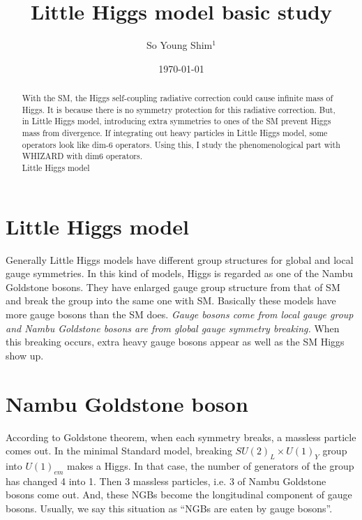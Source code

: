 \documentclass[aps,preprint,floatfix,nofootinbib,showpacs]{revtex4-1}
\begin{document}
\title{Little Higgs model basic study}
\bigskip
\author{So Young Shim$^{1}$}
\date{\today}

\begin{abstract}
With the SM, the Higgs self-coupling radiative correction could cause infinite mass of Higgs. 
It is because there is no symmetry protection for this radiative correction.
But, in Little Higgs model, introducing extra symmetries 
to ones of the SM prevent Higgs mass from divergence.
If integrating out heavy particles in Little Higgs model, 
some operators look like dim-6 operators.
Using this, I study the phenomenological part with WHIZARD with dim6 operators.\\
Little Higgs model 
\end{abstract}

\maketitle


\section{Little Higgs model}
\label{sec:introduction}
Generally Little Higgs models have different group structures 
for global and local gauge symmetries.
In this kind of models, Higgs is regarded as one of the Nambu Goldstone bosons.
They have enlarged gauge group structure from that of SM and 
break the group into the same one with SM. 
Basically these models have more gauge bosons than the SM does. 
{\it Gauge bosons come from local gauge group and Nambu Goldstone 
bosons are from global gauge symmetry breaking.}
When this breaking occurs, extra heavy gauge bosons appear as well as the SM Higgs show up. 

\section{Nambu Goldstone boson}
According to Goldstone theorem, when each symmetry breaks, a massless particle comes out. 
In the minimal Standard model, breaking $SU(2)_L \times U(1)_Y$ group 
into $U(1)_{em}$ makes a Higgs.
In that case, the number of generators of the group has changed 4 into 1. 
Then 3 massless particles, 
i.e. 3 of Nambu Goldstone bosons come out.
And, these NGBs become the longitudinal component of gauge bosons. 
Usually, we say this situation as ``NGBs are eaten by gauge bosons''.
\end{document}
